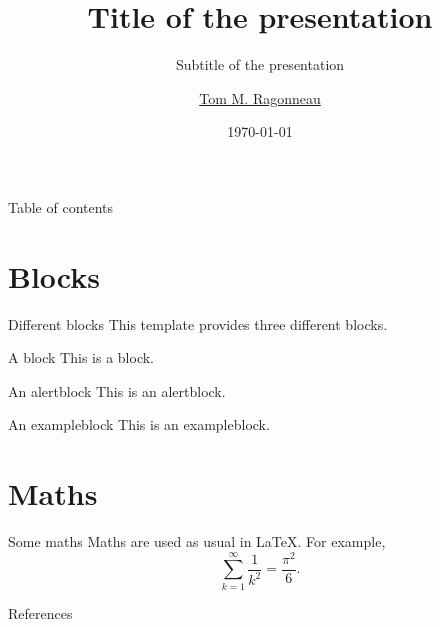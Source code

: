 \documentclass{presentation}
\title{Title of the presentation}
\subtitle{Subtitle of the presentation}
\date{\today}
\author{\href{https://tomragonneau.com/}{Tom M. Ragonneau}}
\institute{
    Department of Applied Mathematics\\
    The Hong Kong Polytechnic University
}
\begin{document}
\maketitle

\begin{frame}{Table of contents}
    \tableofcontents[hideallsubsections]
\end{frame}

\section{Blocks}

\begin{frame}{Different blocks}
    This template provides \alert{three} different blocks.

    \begin{block}{A block}
        This is a block.
    \end{block}

    \begin{alertblock}{An alertblock}
        This is an alertblock.
    \end{alertblock}

    \begin{exampleblock}{An exampleblock}
        This is an exampleblock.
    \end{exampleblock}
\end{frame}

\section{Maths}

\begin{frame}{Some maths}
    Maths are used as usual in \LaTeX.
    For example,
    \begin{equation*}
        \sum_{k = 1}^{\infty} \frac{1}{k^2} = \frac{\pi^2}{6}.
    \end{equation*}
\end{frame}

\appendix

\begin{frame}[t,allowframebreaks]{References}
    \nocite{knut86}
    \printbibliography[heading=none]
\end{frame}
\end{document}
